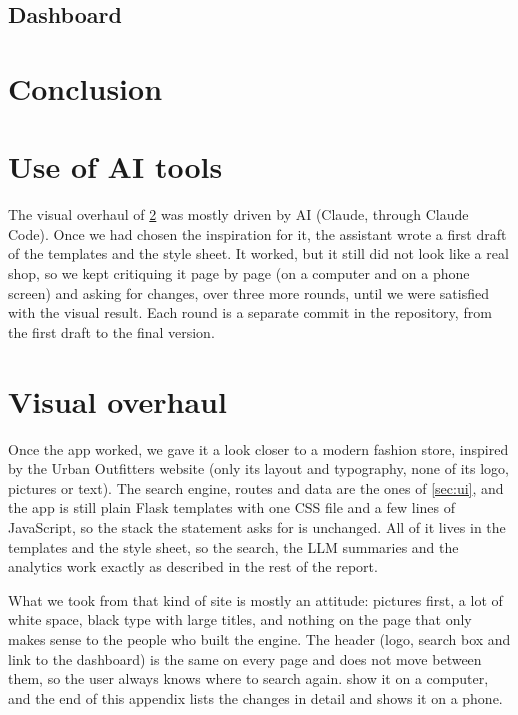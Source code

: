 \documentclass[11pt,a4paper]{article}
\begin{document}
\subsection{Dashboard}

\section{Conclusion}

\section*{Use of AI tools}

The visual overhaul of \cref{app:restyle} was mostly driven by AI (Claude, through Claude Code). Once we had chosen the inspiration for it, the assistant wrote a first draft of the templates and the style sheet. It worked, but it still did not look like a real shop, so we kept critiquing it page by page (on a computer and on a phone screen) and asking for changes, over three more rounds, until we were satisfied with the visual result. Each round is a separate commit in the repository, from the first draft to the final version.

\clearpage
\appendix
\section{Visual overhaul}
\label{app:restyle}

Once the app worked, we gave it a look closer to a modern fashion store, inspired by the Urban Outfitters website (only its layout and typography, none of its logo, pictures or text). The search engine, routes and data are the ones of \cref{sec:ui}, and the app is still plain Flask templates with one CSS file and a few lines of JavaScript, so the stack the statement asks for is unchanged. All of it lives in the templates and the style sheet, so the search, the LLM summaries and the analytics work exactly as described in the rest of the report.

What we took from that kind of site is mostly an attitude: pictures first, a lot of white space, black type with large titles, and nothing on the page that only makes sense to the people who built the engine. The header (logo, search box and link to the dashboard) is the same on every page and does not move between them, so the user always knows where to search again.  show it on a computer, and the end of this appendix lists the changes in detail and shows it on a phone.
\end{document}
